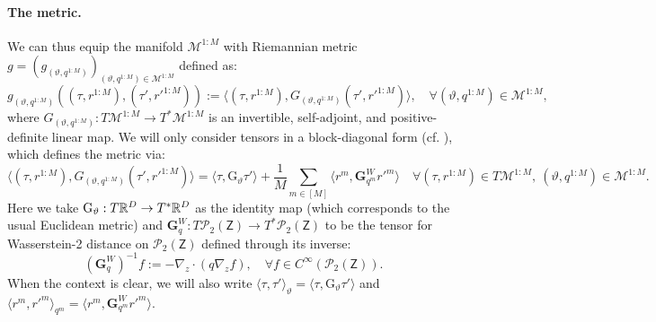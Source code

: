 \paragraph{The metric.}\label{app:metric} We can thus equip the manifold $\mathcal{M}^{1:M}$ with Riemannian metric $g=(g_{(\vartheta, q^{1:M})})_{(\vartheta,q^{1:M})\in \mathcal{M}^{1:M}}$
defined as:
$$
g_{(\vartheta, q^{1:M})}((\tau, r^{1:M}), (\tau', r'^{1:M})) := \langle (\tau, r^{1:M}), G_{(\vartheta, q^{1:M})}(\tau', r'^{1:M}) \rangle, \quad \forall (\vartheta, q^{1:M}) \in \mathcal{M}^{1:M},
$$
where $G_{(\vartheta, q^{1:M})}: T\mathcal{M}^{1:M} \to T^*\mathcal{M}^{1:M}$ is an invertible, self-adjoint, and positive-definite linear map. We will only consider tensors in a block-diagonal form (cf. \citet[Chapter~2]{lee2018riemannian}), which defines the metric via:
\begin{equation}
    \langle (\tau, r^{1:M}), G_{(\vartheta, q^{1:M})}(\tau', r'^{1:M}) \rangle = \langle \tau, \mathrm{G}_{\vartheta} \tau' \rangle + \frac{1}{M}\sum_{m\in[M]} \langle r^m, \mathbf{G}_{q^m}^W r'^m \rangle  \quad \forall (\tau, r^{1:M}) \in T\mathcal{M}^{1:M}, \ (\vartheta, q^{1:M}) \in \mathcal{M}^{1:M}.
\end{equation}
Here we take $\mathrm{G}_{\vartheta}: T\mathbb{R}^D \to T^* \mathbb{R}^D$ as the identity map (which corresponds to the usual Euclidean metric) and $\mathbf{G}_{q}^W: T\mathcal{P}_2(\mathsf{Z}) \to T^*\mathcal{P}_2(\mathsf{Z})$ to be the tensor for Wasserstein-2 distance on $\mathcal{P}_2(\mathsf{Z})$ defined through its inverse:
\begin{equation}
    (\mathbf{G}_q^W)^{-1}f:=-\nabla_{z} \cdot (q \nabla_{z}f), \quad \forall f\in C^\infty(\mathcal{P}_2(\mathsf{Z})).
\end{equation}
When the context is clear, we will also write $\langle\tau, \tau'\rangle_{\vartheta} =\langle \tau, \mathrm{G}_{\vartheta} \tau' \rangle$ and $\langle r^m, r'^m \rangle_{q^m} = \langle r^m, \mathbf{G}_{q^m}^W r'^m \rangle$.


